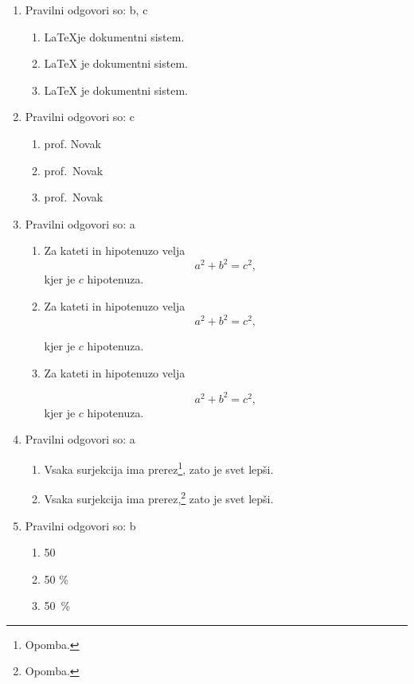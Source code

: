 \documentclass[11pt]{article}
\begin{document}
\begin{enumerate}
    \item Pravilni odgovori so: b, c %
    \begin{enumerate}
        \item \LaTeX je dokumentni sistem.
        \item {\LaTeX} je dokumentni sistem.
        \item \LaTeX{} je dokumentni sistem.
    \end{enumerate}

    \item Pravilni odgovori so: c %
    \begin{enumerate}
        \item prof. Novak
        \item prof.~Novak
        \item prof.\ Novak
    \end{enumerate}

    \item Pravilni odgovori so: a %
    \begin{enumerate}
        \item
Za kateti in hipotenuzo velja
\[
  a^2 + b^2 = c^2,
\]
kjer je \(c\) hipotenuza.
        \item
Za kateti in hipotenuzo velja
\[
  a^2 + b^2 = c^2,
\]

kjer je \(c\) hipotenuza.
        \item
Za kateti in hipotenuzo velja

\[
  a^2 + b^2 = c^2,
\]
kjer je \(c\) hipotenuza.
    \end{enumerate}

    \item Pravilni odgovori so: a%
    \begin{enumerate}
        \item Vsaka surjekcija ima prerez\footnote{Opomba.}, zato je svet lepši.
        \item Vsaka surjekcija ima prerez,\footnote{Opomba.} zato je svet lepši.
    \end{enumerate}

    \item Pravilni odgovori so: b %
    \begin{enumerate}
        \item 50 %
        \item 50 \%
        \item 50~\%
    \end{enumerate}


\end{enumerate}
\end{document}

